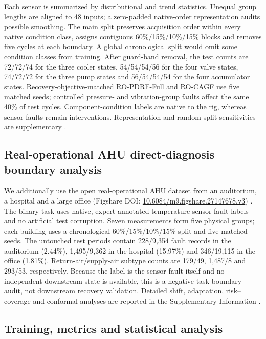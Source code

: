 \documentclass[11pt]{article}
\begin{document}
Each sensor is summarized by distributional and trend statistics. Unequal group lengths are aligned to 48 inputs; a zero-padded native-order representation audits possible smoothing. The main split preserves acquisition order within every native condition class, assigns contiguous 60\%/15\%/10\%/15\% blocks and removes five cycles at each boundary. A global chronological split would omit some condition classes from training. After guard-band removal, the test counts are 72/72/74 for the three cooler states, 54/54/54/56 for the four valve states, 74/72/72 for the three pump states and 56/54/54/54 for the four accumulator states. Recovery-objective-matched RO-PDRF-Full and RO-CAGF use five matched seeds; controlled pressure- and vibration-group faults affect the same 40\% of test cycles. Component-condition labels are native to the rig, whereas sensor faults remain interventions. Representation and random-split sensitivities are supplementary \citep{ma2021multirate,keleko2023hydraulic,yildirim2025hydraulic}.

\subsection{Real-operational AHU direct-diagnosis boundary analysis}

We additionally use the open real-operational AHU dataset from an auditorium, a hospital and a large office (Figshare DOI: \href{https://doi.org/10.6084/m9.figshare.27147678.v3}{10.6084/m9.figshare.27147678.v3}) \citep{wang2025ahuoperational,wang2024ahudataset}. The binary task uses native, expert-annotated temperature-sensor-fault labels and no artificial test corruption. Seven measurements form five physical groups; each building uses a chronological 60\%/15\%/10\%/15\% split and five matched seeds. The untouched test periods contain 228/9,354 fault records in the auditorium (2.44\%), 1,495/9,362 in the hospital (15.97\%) and 346/19,115 in the office (1.81\%). Return-air/supply-air subtype counts are 179/49, 1,487/8 and 293/53, respectively. Because the label is the sensor fault itself and no independent downstream state is available, this is a negative task-boundary audit, not downstream recovery validation. Detailed shift, adaptation, risk--coverage and conformal analyses are reported in the Supplementary Information \citep{sun2016coral,sagawa2020groupdro,mirza2022normalization,podkopaev2021distribution}.

\subsection{Training, metrics and statistical analysis}
\end{document}
